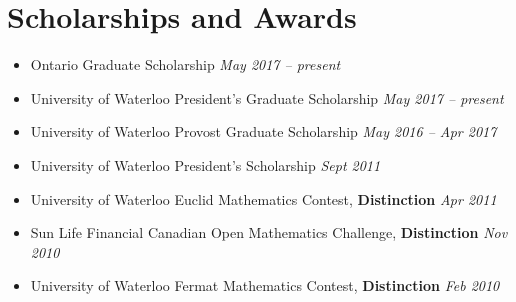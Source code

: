 \section*{Scholarships and Awards}
\vspace{\postsubhead}
\begin{adjustwidth}{\indentleft}{\indentright}
  \begin{itemize}
    
    \item Ontario Graduate Scholarship
    \hfill
    \textit{May 2017 -- present}
    
    \item University of Waterloo President's Graduate Scholarship
    \hfill
    \textit{May 2017 -- present}
    
    \item University of Waterloo Provost Graduate Scholarship
    \hfill
    \textit{May 2016 -- Apr 2017}
    
    \item University of Waterloo President's Scholarship
    \hfill
    \textit{Sept 2011}
    
    \item University of Waterloo Euclid Mathematics Contest, \textbf{Distinction}
    \hfill
    \textit{Apr 2011}
    
    \item Sun Life Financial Canadian Open Mathematics Challenge, \textbf{Distinction}
    \hfill
    \textit{Nov 2010}
    
    \item University of Waterloo Fermat Mathematics Contest, \textbf{Distinction}
    \hfill
    \textit{Feb 2010}
    
  \end{itemize}
\end{adjustwidth}
